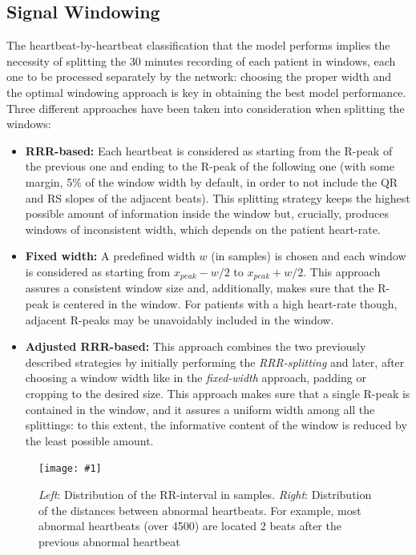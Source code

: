 \documentclass[conference]{IEEEtran}
\newcommand{\addfigure}[3]{
    \begin{figure}
        \texttt{[image: \#1]}
        \caption{#2}
        \label{#3}
    \end{figure}
}
\begin{document}
    

\subsection{Signal Windowing}
    The heartbeat-by-heartbeat classification that the model performs
    implies the necessity of splitting the 30 minutes recording of
    each patient in windows, each one to be processed separately by
    the network: choosing the proper width and the optimal windowing
    approach is key in obtaining the best model performance. Three
    different approaches have been taken into consideration when
    splitting the windows:
    \begin{itemize}
        \item \textbf{RRR-based: }Each heartbeat is considered as
        starting from the R-peak of the previous one and ending to the
        R-peak of the following one (with some margin, 5\% of the
        window width by default, in order to not include the QR and RS
        slopes of the adjacent beats). This splitting strategy keeps
        the highest possible amount of information inside the window
        but, crucially, produces windows of inconsistent width, which
        depends on the patient heart-rate.
        \item \textbf{Fixed width: }A predefined width $w$ (in
        samples) is chosen and each window is considered as starting
        from $x_{peak}-w/2$ to $x_{peak}+w/2$. This approach assures a
        consistent window size and, additionally, makes sure that the
        R-peak is centered in the window. For patients with a high
        heart-rate though, adjacent R-peaks may be unavoidably
        included in the window.
        \item \textbf{Adjusted RRR-based: }This approach combines the
        two previously described strategies by initially performing
        the \textit{RRR-splitting} and later, after choosing a window
        width like in the \textit{fixed-width} approach, padding or
        cropping to the desired size. This approach makes sure that a
        single R-peak is contained in the window, and it assures a
        uniform width among all the splittings: to this extent, the
        informative content of the window is reduced by the least
        possible amount. 
    \end{itemize}

    \addfigure
        {img/histograms.jpg} {\textit{Left}: Distribution of the
        RR-interval in samples. \textit{Right}: Distribution of the
        distances between abnormal heartbeats. For example, most
        abnormal heartbeats (over 4500) are located 2 beats after the
        previous abnormal heartbeat } {fig:hists}
\end{document}
